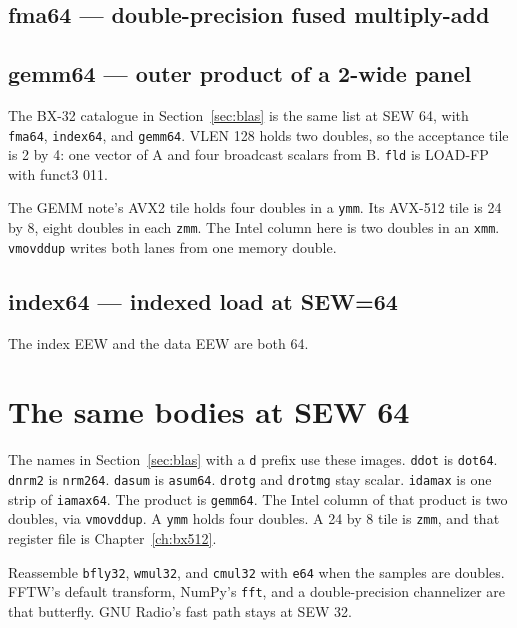 

\subsection{fma64 --- double-precision fused multiply-add}


\subsection{gemm64 --- outer product of a 2-wide panel}

The BX-32 catalogue in Section~\ref{sec:blas} is the same list at SEW 64, with \texttt{fma64}, \texttt{index64}, and \texttt{gemm64}. VLEN 128 holds two doubles, so the acceptance tile is 2 by 4: one vector of A and four broadcast scalars from B. \texttt{fld} is LOAD-FP with funct3 011.

The GEMM note's AVX2 tile holds four doubles in a \texttt{ymm}. Its AVX-512 tile is 24 by 8, eight doubles in each \texttt{zmm}. The Intel column here is two doubles in an \texttt{xmm}. \texttt{vmovddup} writes both lanes from one memory double.



\subsection{index64 --- indexed load at SEW=64}
The index EEW and the data EEW are both 64.



\section{The same bodies at SEW 64}

The names in Section~\ref{sec:blas} with a \texttt{d} prefix use these images. \texttt{ddot} is \texttt{dot64}. \texttt{dnrm2} is \texttt{nrm264}. \texttt{dasum} is \texttt{asum64}. \texttt{drotg} and \texttt{drotmg} stay scalar. \texttt{idamax} is one strip of \texttt{iamax64}. The product is \texttt{gemm64}. The Intel column of that product is two doubles, via \texttt{vmovddup}. A \texttt{ymm} holds four doubles. A 24 by 8 tile is \texttt{zmm}, and that register file is Chapter~\ref{ch:bx512}.

Reassemble \texttt{bfly32}, \texttt{wmul32}, and \texttt{cmul32} with \texttt{e64} when the samples are doubles. FFTW's default transform, NumPy's \texttt{fft}, and a double-precision channelizer are that butterfly. GNU Radio's fast path stays at SEW 32.

